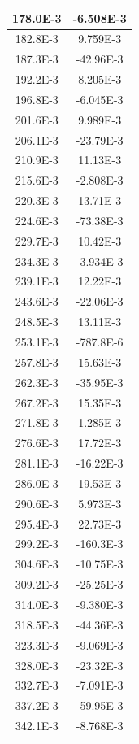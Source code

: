 \documentclass[english, 12pt, a4paper]{ifimaster}
\begin{document}
\begin{appendices}
\begin{center}
\begin{longtable}[htbp]{|c|c|}
\hline
  178.0E-3 & -6.508E-3 \\
\hline
  182.8E-3 & 9.759E-3 \\
\hline
  187.3E-3 & -42.96E-3 \\
\hline
  192.2E-3 & 8.205E-3 \\
\hline
  196.8E-3 & -6.045E-3 \\
\hline
  201.6E-3 & 9.989E-3 \\
\hline
  206.1E-3 & -23.79E-3 \\
\hline
  210.9E-3 & 11.13E-3 \\
\hline
  215.6E-3 & -2.808E-3 \\
\hline
  220.3E-3 & 13.71E-3 \\
\hline
  224.6E-3 & -73.38E-3 \\
\hline
  229.7E-3 & 10.42E-3 \\
\hline
  234.3E-3 & -3.934E-3 \\
\hline
  239.1E-3 & 12.22E-3 \\
\hline
  243.6E-3 & -22.06E-3 \\
\hline
  248.5E-3 & 13.11E-3 \\
\hline
  253.1E-3 & -787.8E-6 \\
\hline
  257.8E-3 & 15.63E-3 \\
\hline
  262.3E-3 & -35.95E-3 \\
\hline
  267.2E-3 & 15.35E-3 \\
\hline
  271.8E-3 & 1.285E-3 \\
\hline
  276.6E-3 & 17.72E-3 \\
\hline
  281.1E-3 & -16.22E-3 \\
\hline
  286.0E-3 & 19.53E-3 \\
\hline
  290.6E-3 & 5.973E-3 \\
\hline
  295.4E-3 & 22.73E-3 \\
\hline
  299.2E-3 & -160.3E-3 \\
\hline
  304.6E-3 & -10.75E-3 \\
\hline
  309.2E-3 & -25.25E-3 \\
\hline
  314.0E-3 & -9.380E-3 \\
\hline
  318.5E-3 & -44.36E-3 \\
\hline
  323.3E-3 & -9.069E-3 \\
\hline
  328.0E-3 & -23.32E-3 \\
\hline
  332.7E-3 & -7.091E-3 \\
\hline
  337.2E-3 & -59.95E-3 \\
\hline
  342.1E-3 & -8.768E-3 \\

\end{longtable}
\end{center}
\end{appendices}
\end{document}
